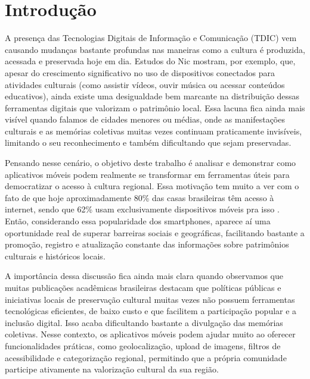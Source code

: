 \chapter{Introdução}

A presença das Tecnologias Digitais de Informação e Comunicação (TDIC) vem causando mudanças bastante profundas nas maneiras como a cultura é produzida, acessada e preservada hoje em dia. Estudos do Nic \cite{nic-cultura-tecnologias-no-brasil} mostram, por exemplo, que, apesar do crescimento significativo no uso de dispositivos conectados para atividades culturais (como assistir vídeos, ouvir música ou acessar conteúdos educativos), ainda existe uma desigualdade bem marcante na distribuição dessas ferramentas digitais que valorizam o patrimônio local. Essa lacuna fica ainda mais visível quando falamos de cidades menores ou médias, onde as manifestações culturais e as memórias coletivas muitas vezes continuam praticamente invisíveis, limitando o seu reconhecimento e também dificultando que sejam preservadas. \cite{prolam-cultura-viva-2025} \cite{soster2021tecnologias}

Pensando nesse cenário, o objetivo deste trabalho é analisar e demonstrar como aplicativos móveis podem realmente se transformar em ferramentas úteis para democratizar o acesso à cultura regional. Essa motivação tem muito a ver com o fato de que hoje aproximadamente 80\% das casas brasileiras têm acesso à internet, sendo que 62\% usam exclusivamente dispositivos móveis pra isso \cite{mcom-2023-internet}. Então, considerando essa popularidade dos smartphones, aparece aí uma oportunidade real de superar barreiras sociais e geográficas, facilitando bastante a promoção, registro e atualização constante das informações sobre patrimônios culturais e históricos locais.

A importância dessa discussão fica ainda mais clara quando observamos que muitas publicações acadêmicas brasileiras \cite{prolam-cultura-viva-2025} destacam que políticas públicas e iniciativas locais de preservação cultural muitas vezes não possuem ferramentas tecnológicas eficientes, de baixo custo e que facilitem a participação popular e a inclusão digital. Isso acaba dificultando bastante a divulgação das memórias coletivas. Nesse contexto, os aplicativos móveis podem ajudar muito ao oferecer funcionalidades práticas, como geolocalização, upload de imagens, filtros de acessibilidade e categorização regional, permitindo que a própria comunidade participe ativamente na valorização cultural da sua região.

